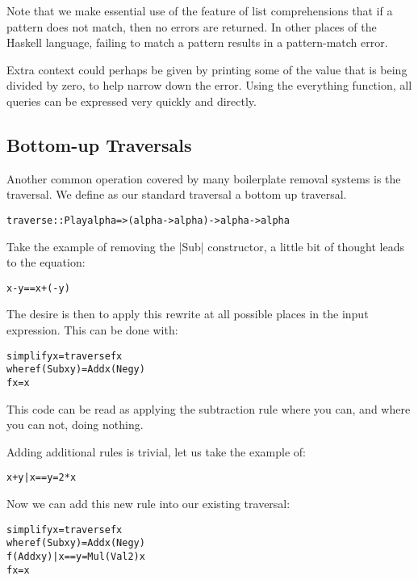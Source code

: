 \documentclass[preprint]{sigplanconf}
\newcommand{\C}[1]{\textsf{#1}}
\newenvironment{code}{\begin{alltt}\small}{\end{alltt}}
\begin{document}
Note that we make essential use of the feature of list comprehensions that if a pattern does not match, then no errors are returned. In other places of the Haskell language, failing to match a pattern results in a pattern-match error.

Extra context could perhaps be given by printing some of the value that is being divided by zero, to help narrow down the error. Using the \C{everything} function, all queries can be expressed very quickly and directly.

\subsection{Bottom-up Traversals}

Another common operation covered by many boilerplate removal systems is the traversal.
We define as our standard traversal a bottom up traversal.

\begin{code}
traverse :: Play alpha => (alpha -> alpha) -> alpha -> alpha
\end{code}

Take the example of removing the |Sub| constructor, a little bit of thought leads to the equation:

\begin{code}
x - y == x + (- y)
\end{code}

The desire is then to apply this rewrite at all possible places in the input expression. This can be done with:

\begin{code}
simplify x = traverse f x
    where  f (Sub x y)  = Add x (Neg y)
           f x          = x
\end{code}

This code can be read as applying the subtraction rule where you can, and where you can not, doing nothing.

Adding additional rules is trivial, let us take the example of:

\begin{code}
x + y | x == y = 2 * x
\end{code}

Now we can add this new rule into our existing traversal:

\begin{code}
simplify x = traverse f x
    where  f (Sub x y)           = Add x (Neg y)
           f (Add x y) | x == y  = Mul (Val 2) x
           f x                   = x
\end{code}
\end{document}
